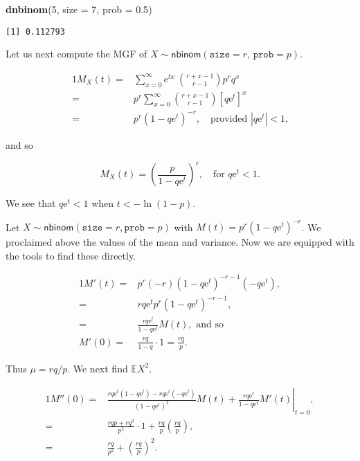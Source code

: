 \documentclass[]{book}
\newenvironment{Shaded}{\begin{snugshade}}{\end{snugshade}}
\newcommand{\KeywordTok}[1]{\textcolor[rgb]{0.13,0.29,0.53}{\textbf{{#1}}}}
\newcommand{\DataTypeTok}[1]{\textcolor[rgb]{0.13,0.29,0.53}{{#1}}}
\newcommand{\DecValTok}[1]{\textcolor[rgb]{0.00,0.00,0.81}{{#1}}}
\newcommand{\FloatTok}[1]{\textcolor[rgb]{0.00,0.00,0.81}{{#1}}}
\newcommand{\NormalTok}[1]{{#1}}
\numberwithin{equation}{chapter}
\numberwithin{figure}{chapter}
\theoremstyle{plain}
\theoremstyle{definition}
\theoremstyle{remark}
\theoremstyle{definition}
\theoremstyle{definition}
\theoremstyle{remark}
\begin{document}
\begin{Shaded}
\begin{Highlighting}[]
\KeywordTok{dnbinom}\NormalTok{(}\DecValTok{5}\NormalTok{, }\DataTypeTok{size =} \DecValTok{7}\NormalTok{, }\DataTypeTok{prob =} \FloatTok{0.5}\NormalTok{)}
\end{Highlighting}
\end{Shaded}

\begin{verbatim}
[1] 0.112793
\end{verbatim}

Let us next compute the MGF of
\(X\sim\mathsf{nbinom}(\mathtt{size}=r,\,\mathtt{prob}=p)\).

\begin{alignat*}{1}
M_{X}(t)= & \sum_{x=0}^{\infty}\mathrm{e}^{tx}\ {r+x-1 \choose r-1}p^{r}q^{x}\\
= & p^{r}\sum_{x=0}^{\infty}{r+x-1 \choose r-1}[q\mathrm{e}^{t}]^{x}\\
= & p^{r}(1-qe^{t})^{-r},\quad \mbox{provided $|q\mathrm{e}^{t}|<1$,}
\end{alignat*}

and so

\begin{equation}
M_{X}(t)=\left(\frac{p}{1-q\mathrm{e}^{t}}\right)^{r},\quad \mbox{for $q\mathrm{e}^{t}<1$}.
\end{equation}

We see that \(q\mathrm{e}^{t}<1\) when \(t<-\ln(1-p)\).

Let \(X\sim\mathsf{nbinom}(\mathtt{size}=r,\mathtt{prob}=p)\) with
\(M(t)=p^{r}(1-q\mathrm{e}^{t})^{-r}\). We proclaimed above the values
of the mean and variance. Now we are equipped with the tools to find
these directly.

\begin{alignat*}{1}
M'(t)= & p^{r}(-r)(1-q\mathrm{e}^{t})^{-r-1}(-q\mathrm{e}^{t}),\\
= & rq\mathrm{e}^{t}p^{r}(1-q\mathrm{e}^{t})^{-r-1},\\
= & \frac{rq\mathrm{e}^{t}}{1-q\mathrm{e}^{t}}M(t),\mbox{ and so }\\
M'(0)= & \frac{rq}{1-q}\cdot1=\frac{rq}{p}.
\end{alignat*}

Thus \(\mu=rq/p\). We next find \(\mathbb{E} X^{2}\).

\begin{alignat*}{1}
M''(0)= & \left.\frac{rq\mathrm{e}^{t}(1-q\mathrm{e}^{t})-rq\mathrm{e}^{t}(-q\mathrm{e}^{t})}{(1-q\mathrm{e}^{t})^{2}}M(t)+\frac{rq\mathrm{e}^{t}}{1-q\mathrm{e}^{t}}M'(t)\right|_{t=0},\\
= & \frac{rqp+rq^{2}}{p^{2}}\cdot1+\frac{rq}{p}\left(\frac{rq}{p}\right),\\
= & \frac{rq}{p^{2}}+\left(\frac{rq}{p}\right)^{2}.
\end{alignat*}
\end{document}
